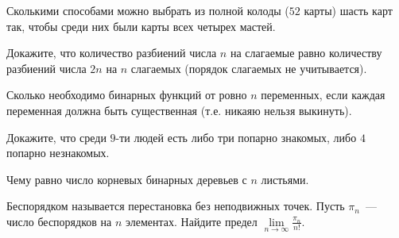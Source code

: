 \setcounter{curtask}{24}


\begin{task}
    Сколькими способами можно выбрать из полной колоды ($52$ карты) шасть карт так,
    чтобы среди них были карты всех четырех мастей.
\end{task}

\begin{task}
    Докажите, что количество разбиений числа $n$ на слагаемые равно количеству
    разбиений числа $2n$ на $n$ слагаемых (порядок слагаемых не учитывается).
\end{task}

\begin{task}
    Сколько необходимо бинарных функций от ровно $n$ переменных, если каждая
    переменная должна быть существенная (т.е. никаяю нельзя выкинуть).
\end{task}

\begin{task}
    Докажите, что среди $9$-ти людей есть либо три попарно знакомых, либо $4$ попарно
    незнакомых.
\end{task}

\begin{task}
    Чему равно число корневых бинарных деревьев с $n$ листьями.
\end{task}

\begin{task}
    Беспорядком называется перестановка без неподвижных точек. Пусть $\pi_n$~---
    число беспорядков на $n$ элементах. Найдите предел $\lim\limits_{n \to \infty}
    \frac{\pi_n}{n!}$.
\end{task}